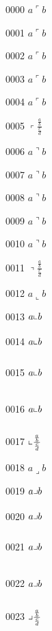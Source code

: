 \documentclass{article}
\begin{document}
0000 $a\ulcorner b$\par
0001 $a\big\ulcorner b$\par
0002 $a\Big\ulcorner b$\par
0003 $a\bigg\ulcorner b$\par
0004 $a\Bigg\ulcorner b$\par
0005 $\left\ulcorner \frac{\frac{a}{b}}{\frac{c}{d}}\right.$\par
0006 $a\urcorner b$\par
0007 $a\big\urcorner b$\par
0008 $a\Big\urcorner b$\par
0009 $a\bigg\urcorner b$\par
0010 $a\Bigg\urcorner b$\par
0011 $\left\urcorner \frac{\frac{a}{b}}{\frac{c}{d}}\right.$\par
0012 $a\llcorner b$\par
0013 $a\big\llcorner b$\par
0014 $a\Big\llcorner b$\par
0015 $a\bigg\llcorner b$\par
0016 $a\Bigg\llcorner b$\par
0017 $\left\llcorner \frac{\frac{a}{b}}{\frac{c}{d}}\right.$\par
0018 $a\lrcorner b$\par
0019 $a\big\lrcorner b$\par
0020 $a\Big\lrcorner b$\par
0021 $a\bigg\lrcorner b$\par
0022 $a\Bigg\lrcorner b$\par
0023 $\left\lrcorner \frac{\frac{a}{b}}{\frac{c}{d}}\right.$\par
\end{document}
